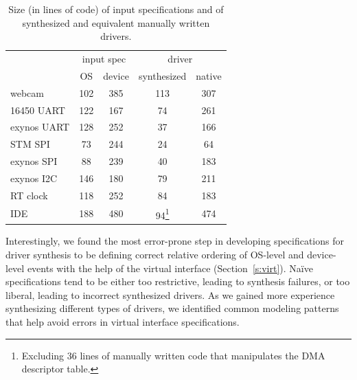 \begin{table}
    \begin{minipage}{\linewidth}
    \center
    \begin{tabular}{|l|c|c|c|c|}
        \hline
        & \multicolumn{2}{|c|}{input spec} & \multicolumn{2}{c|}{driver} \\
        \cline{2-5}
                     & OS  & device & synthesized & native \\
        \hline
        \hline
        webcam       & 102 & 385    & 113         & 307 \\
        16450 UART   & 122 & 167    & 74          & 261 \\
        exynos UART  & 128 & 252    & 37          & 166 \\
        STM SPI      & 73  & 244    & 24          & 64  \\
        exynos SPI   & 88  & 239    & 40          & 183 \\
        exynos I2C   & 146 & 180    & 79          & 211 \\
        RT clock     & 118 & 252    & 84          & 183 \\
        IDE          & 188 & 480    & 94\footnote{Excluding 36 lines of manually written code that manipulates the DMA descriptor table.} & 474 \\
        \hline
    \end{tabular}
    \end{minipage}
    \caption{Size (in lines of code) of input specifications and of synthesized and equivalent manually written drivers.}
    \label{t:size}
\end{table}

Interestingly, we found the most error-prone step in developing specifications for driver synthesis to be defining correct relative ordering of OS-level and device-level events with the help of the virtual interface (Section~\ref{s:virt}).  Na\"ive specifications tend to be either too restrictive, leading to synthesis failures, or too liberal, leading to incorrect synthesized drivers. As we gained more experience synthesizing different types of drivers, we identified common modeling patterns that help avoid errors in virtual interface specifications.  

